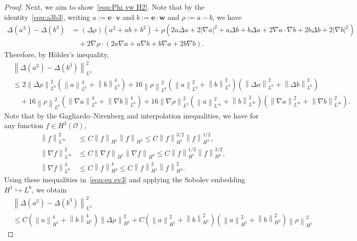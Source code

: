 \documentclass[11pt, reqno]{amsart}
\theoremstyle{definition}
\numberwithin{equation}{section}
\newcommand{\bff}{\boldsymbol}
\newcommand{\norm}[2]{\left\|{#1}\right\|_{#2}}
\begin{document}
\begin{proof}
Next, we aim to show~\eqref{equ:Phi vw H2}. Note that by the identity~\eqref{equ:a3b3}, writing $a:=\bff{e}\cdot \bff{v}$ and $b:=\bff{e}\cdot \bff{w}$ and $\rho:=a-b$, we have
\begin{align*}
    \Delta(a^3)-\Delta(b^3)
    &=
    (\Delta \rho) (a^2+ab+b^2) 
    +
    \rho (2a\Delta a+ 2|\nabla a|^2 + a\Delta b+ b\Delta a+ 2\nabla a \cdot \nabla b + 2b \Delta b+ 2|\nabla b|^2)
    \nonumber \\
    &\quad
    +
    2\nabla \rho \cdot (2a\nabla a+ a\nabla b + b\nabla a + 2b \nabla b).
\end{align*}
Therefore, by H\"older's inequality,
\begin{align}\label{equ:eu ev3}
    &\norm{\Delta(a^3)-\Delta(b^3)}{L^2}^2
    \nonumber \\
    &\leq
    2\norm{\Delta\rho}{L^6}^2 \left(\norm{a}{L^6}^4+ \norm{b}{L^6}^4 \right)
    +
    16\norm{\rho}{L^6}^2 \left(\norm{a}{L^6}^2 + \norm{b}{L^6}^2\right) \left(\norm{\Delta a}{L^6}^2 + \norm{\Delta b}{L^6}^2 \right)
    \nonumber \\
    &\quad
    +
    16\norm{\rho}{L^6}^2 \left(\norm{\nabla a}{L^6}^4 + \norm{\nabla b}{L^6}^4 \right)
    +
    16\norm{\nabla \rho}{L^2}^2 \left(\norm{a}{L^\infty}^2 + \norm{b}{L^\infty}^2\right) \left(\norm{\nabla a}{L^\infty}^2 + \norm{\nabla b}{L^\infty}^2 \right).
\end{align}
Note that by the Gagliardo--Nirenberg and interpolation inequalities, we have for any function $f\in H^3(\mathscr{O})$,
\begin{align*}
    \norm{f}{L^\infty}^2 &\leq C \norm{f}{H^1} \norm{f}{H^2} 
    \leq
    C \norm{f}{H^1}^{3/2} \norm{f}{H^3}^{1/2},
    \\
    \norm{\nabla f}{L^\infty}^2 &\leq C \norm{\nabla f}{H^1} \norm{\nabla f}{H^2}
    \leq
    C \norm{f}{H^1}^{1/2} \norm{f}{H^3}^{3/2},
    \\
    \norm{\nabla f}{L^6}^4 &\leq C \norm{f}{H^2}^4 
    \leq
    C \norm{f}{H^1}^2 \norm{f}{H^3}^2.
\end{align*}
Using these inequalities in~\eqref{equ:eu ev3} and applying the Sobolev embedding $H^1\hookrightarrow L^6$, we obtain
\begin{align}\label{equ:a3b3 ineq}
    &\norm{\Delta(a^3)-\Delta(b^3)}{L^2}^2
    \nonumber \\
    &\leq
    C\left(\norm{a}{H^1}^4+ \norm{b}{H^1}^4 \right) \norm{\Delta\rho}{H^1}^2 
    +
    C \left(\norm{a}{H^1}^2+ \norm{b}{H^1}^2 \right) \left(\norm{a}{H^3}^2+ \norm{b}{H^3}^2 \right) \norm{\rho}{H^1}^2

\end{align}
\end{proof}
\end{document}
